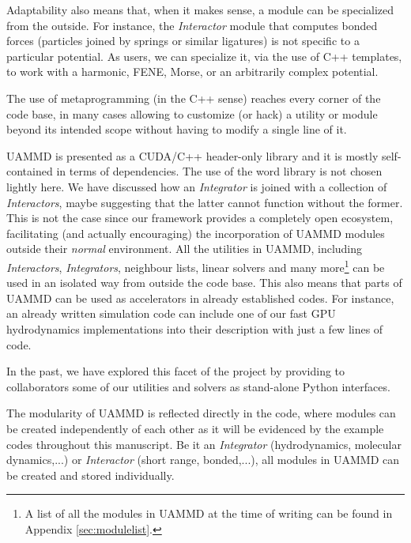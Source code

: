 \documentclass[twoside,openright,titlepage,numbers=noenddot,%
headinclude,footinclude,cleardoublepage=empty,abstract=on,
BCOR=5mm,fontsize=11pt, dvipsnames, paper=b5
]{scrreprt}
\newcommand{\uammd}{\gls{UAMMD}\xspace}
\newcommand{\gpu}{\gls{GPU}\xspace}
\begin{document}
Adaptability also means that, when it makes sense, a module can be specialized from the outside. For instance, the \emph{Interactor} module that computes bonded forces (particles joined by springs or similar ligatures) is not specific to a particular potential. As users, we can specialize it, via the use of C++ templates, to work with a harmonic, FENE\cite{Warner1972}, Morse\cite{Morse1929}, or an arbitrarily complex potential.

The use of metaprogramming (in the C++ sense) reaches every corner of the code base, in many cases allowing to customize (or hack) a utility or module beyond its intended scope without having to modify a single line of it.

\uammd is presented as a CUDA/C++ header-only library and it is mostly self-contained in terms of dependencies. The use of the word library is not chosen lightly here. We have discussed how an \emph{Integrator} is joined with a collection of \emph{Interactors}, maybe suggesting that the latter cannot function without the former. This is not the case since our framework provides a completely open ecosystem, facilitating (and actually encouraging) the incorporation of \uammd modules outside their \emph{normal} environment.
All the utilities in \uammd, including \emph{Interactors}, \emph{Integrators}, neighbour lists, linear solvers and many more\footnote{A list of all the modules in \uammd at the time of writing can be found in Appendix \ref{sec:modulelist}.} can be used in an isolated way from outside the code base. This also means that parts of \uammd can be used as accelerators in already established codes. For instance, an already written simulation code can include one of our fast \gpu hydrodynamics implementations into their description with just a few lines of code.

In the past, we have explored this facet of the project by providing to collaborators some of our utilities and solvers as stand-alone Python interfaces.

The modularity of \uammd is reflected directly in the code, where modules can be created independently of each other as it will be evidenced by the example codes throughout this manuscript.
Be it an \emph{Integrator} (hydrodynamics, molecular dynamics,...) or \emph{Interactor} (short range, bonded,...), all modules in \uammd can be created and stored individually.
\end{document}
